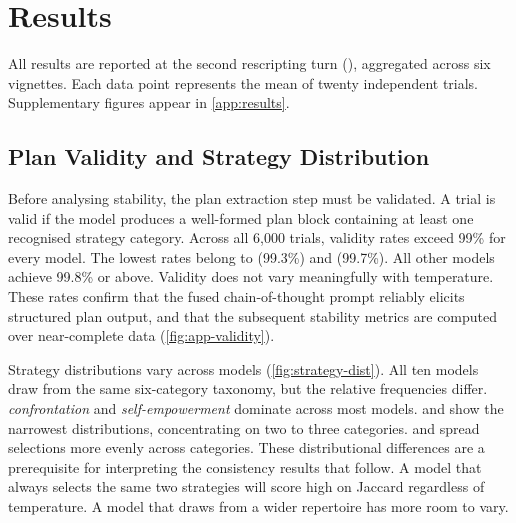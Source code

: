 \chapter{Results}
\label{chap:results}

All results are reported at the second rescripting turn
(), aggregated across six vignettes. Each data point
represents the mean of twenty independent trials. Supplementary figures
appear in \autoref{app:results}.

\section{Plan Validity and Strategy Distribution}
\label{sec:res-validity}

Before analysing stability, the plan extraction step must be validated.
A trial is valid if the model produces a well-formed plan block containing
at least one recognised strategy category. Across all 6{,}000 trials,
validity rates exceed 99\% for every model. The lowest rates belong to
 (99.3\%) and  (99.7\%).
All other models achieve 99.8\% or above. Validity does not vary
meaningfully with temperature. These rates confirm that the fused
chain-of-thought prompt reliably elicits structured plan output, and that
the subsequent stability metrics are computed over near-complete data
(\autoref{fig:app-validity}).

Strategy distributions vary across models (\autoref{fig:strategy-dist}).
All ten models draw from the same six-category taxonomy, but the relative
frequencies differ. \emph{confrontation} and \emph{self-empowerment}
dominate across most models.  and
 show the narrowest distributions, concentrating on
two to three categories.  and
 spread selections more evenly across categories.
These distributional differences are a prerequisite for interpreting the
consistency results that follow. A model that always selects the same two
strategies will score high on Jaccard regardless of temperature. A model
that draws from a wider repertoire has more room to vary.

